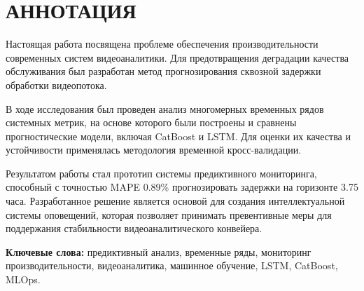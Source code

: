 \chapter*{АННОТАЦИЯ}

\hspace*{1.25cm}Настоящая работа посвящена проблеме обеспечения производительности современных систем видеоаналитики. Для предотвращения деградации качества обслуживания был разработан метод прогнозирования сквозной задержки обработки видеопотока.

\hspace*{1.25cm}В ходе исследования был проведен анализ многомерных временных рядов системных метрик, на основе которого были построены и сравнены прогностические модели, включая CatBoost и LSTM. Для оценки их качества и устойчивости применялась методология временной кросс-валидации.

\hspace*{1.25cm}Результатом работы стал прототип системы предиктивного мониторинга, способный с точностью MAPE 0.89\% прогнозировать задержки на горизонте 3.75 часа. Разработанное решение является основой для создания интеллектуальной системы оповещений, которая позволяет принимать превентивные меры для поддержания стабильности видеоаналитического конвейера.

\vspace*{1cm}
\hspace*{1.25cm}\textbf{Ключевые слова:} предиктивный анализ, временные ряды, мониторинг производительности, видеоаналитика, машинное обучение, LSTM, CatBoost, MLOps.

\newpage 